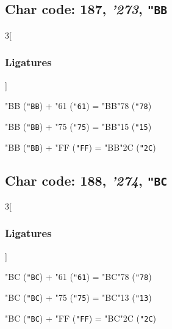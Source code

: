 \documentclass{article}
\newlength{\maxcharwidth}
\begin{document}
\subsection{Char code: 187, {\it'273}, {\tt"BB}}
\label{char_187}


\begin{multicols}{3}[\subsubsection{Ligatures}]

{\testfont\char"BB\noboundary} ({\tt"BB}) + {\testfont\char"61\noboundary} ({\tt"61}) = {\testfont\char"BB\noboundary}{\testfont\char"78\noboundary} ({\tt"78}) 

{\testfont\char"BB\noboundary} ({\tt"BB}) + {\testfont\char"75\noboundary} ({\tt"75}) = {\testfont\char"BB\noboundary}{\testfont\char"15\noboundary} ({\tt"15}) 

{\testfont\char"BB\noboundary} ({\tt"BB}) + {\testfont\char"FF\noboundary} ({\tt"FF}) = {\testfont\char"BB\noboundary}{\testfont\char"2C\noboundary} ({\tt"2C}) 

\end{multicols}

\subsection{Char code: 188, {\it'274}, {\tt"BC}}
\label{char_188}


\begin{multicols}{3}[\subsubsection{Ligatures}]

{\testfont\char"BC\noboundary} ({\tt"BC}) + {\testfont\char"61\noboundary} ({\tt"61}) = {\testfont\char"BC\noboundary}{\testfont\char"78\noboundary} ({\tt"78}) 

{\testfont\char"BC\noboundary} ({\tt"BC}) + {\testfont\char"75\noboundary} ({\tt"75}) = {\testfont\char"BC\noboundary}{\testfont\char"13\noboundary} ({\tt"13}) 

{\testfont\char"BC\noboundary} ({\tt"BC}) + {\testfont\char"FF\noboundary} ({\tt"FF}) = {\testfont\char"BC\noboundary}{\testfont\char"2C\noboundary} ({\tt"2C}) 

\end{multicols}
\end{document}
